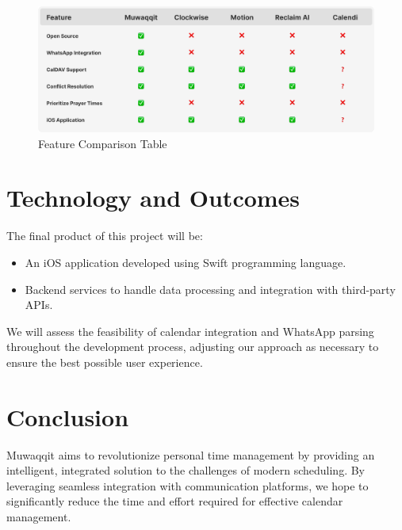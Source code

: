 \documentclass[12pt,a4paper]{article}
\begin{document}
\begin{figure}[!h]
    \centering
    \includegraphics[width=\textwidth]{images/features-table.png}
    \caption{Feature Comparison Table}
    \label{fig:features-table}
\end{figure}

\section{Technology and Outcomes}

The final product of this project will be:

\begin{itemize}
    \item An iOS application developed using Swift programming language.
    \item Backend services to handle data processing and integration with third-party APIs.
\end{itemize}

We will assess the feasibility of calendar integration and WhatsApp parsing throughout the development process, adjusting our approach as necessary to ensure the best possible user experience.

\section{Conclusion}

Muwaqqit aims to revolutionize personal time management by providing an intelligent, integrated solution to the challenges of modern scheduling. By leveraging seamless integration with communication platforms, we hope to significantly reduce the time and effort required for effective calendar management.

\newpage

 

\end{document}

